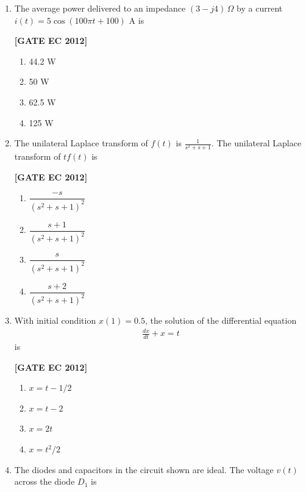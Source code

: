\documentclass[12pt]{article}
\begin{document}
\begin{enumerate}[leftmargin=1.0em, label=\textbf{Q.\arabic*.}, itemsep=2em]
\item The average power delivered to an impedance $(3-j4)\,\Omega$ by a current $i(t) = 5\cos(100\pi t + 100)$ A is

\noindent \textbf{[GATE EC 2012]}
\begin{multicols}{2}
    \begin{enumerate}
        \item 44.2 W
        \item 50 W
        \item 62.5 W
        \item 125 W
    \end{enumerate}
\end{multicols}

\item The unilateral Laplace transform of $f(t)$ is $\tfrac{1}{s^2+s+1}$. The unilateral Laplace transform of $t f(t)$ is

\noindent \textbf{[GATE EC 2012]}
\begin{multicols}{2}
    \begin{enumerate}
        \item $\dfrac{-s}{(s^2+s+1)^2}$
        \item $\dfrac{s+1}{(s^2+s+1)^2}$
        \item $\dfrac{s}{(s^2+s+1)^2}$
        \item $\dfrac{s+2}{(s^2+s+1)^2}$
    \end{enumerate}
\end{multicols}

\item With initial condition $x(1)=0.5$, the solution of the differential equation
\begin{align*}
\frac{dx}{dt} + x = t
\end{align*}
is

\noindent \textbf{[GATE EC 2012]}
\begin{multicols}{2}
    \begin{enumerate}
        \item $x = t - 1/2$
        \item $x = t - 2$
        \item $x = 2t$
        \item $x = t^2/2$
    \end{enumerate}
\end{multicols}

\item The diodes and capacitors in the circuit shown are ideal. The voltage $v(t)$ across the diode $D_1$ is


\end{enumerate}
\end{document}
